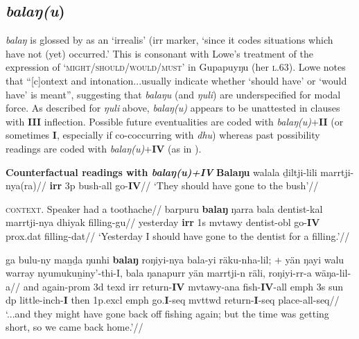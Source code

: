 \subsection*{\textit{balaŋ(u})}


\textit{balaŋ} is glossed by \cite[353]{Wilkinson1991} as an `irrealis' (\gls{irr} marker, `since it codes situations which have not (yet) occurred.' This is consonant with Lowe's treatment of the expression of `\textsc{might/should/would/must}' in Gupapuyŋu (her \textsc{l}.63). Lowe notes that ``[c]ontext and intonation...usually indicate whether `should have' or `would have' is meant'', suggesting that \textit{balaŋu} (and \textit{ŋuli}) are underspecified for modal force. As described for \textit{ŋuli} above, \textit{balaŋ(u)} appears to be unattested in clauses with \textbf{III} inflection. Possible future eventualities are coded with \textit{balaŋ(u)}+\textbf{II} (or sometimes \textbf{I}, especially if co-coccurring with \textit{dhu}) whereas past possibility readings are coded with \textit{balaŋ(u)}+\textbf{IV} (as in ).

\pex \textbf{Counterfactual readings with \textit{balaŋ(u)+IV}}
\a{}\begingl\gla\textbf{Balaŋu} walala ḏiltji-lili marrtji-nya(ra)//
\glb \textbf{\gls{irr}} 3p bush-\gls{all} go-\textbf{IV}// 
\glft`They should have gone to the bush'//\endgl

\a{}\begingl\glpreamble \textsc{context.} Speaker had a toothache//
\gla barpuru \textbf{balaŋ} ŋarra bala dentist-kal marrtji-nya dhiyak filling-gu//
\glb yesterday \textbf{\gls{irr}} 1s \gls{mvtawy} dentist-\gls{obl} go-\textbf{IV} \gls{prox}.\gls{dat} filling-\gls{dat}//
\glft`Yesterday I should have gone to the dentist for a filling.'//\endgl


\a{}\begingl\gla ga bulu-ny maṉḏa ŋunhi \textbf{balaŋ} roŋiyi-nya bala-yi räku-nha-lil; + yän ŋayi walu warray nyumukuṉiny'-thi-I, bala ŋanapurr yän marrtji-n räli, roŋiyi-rr-a wäŋa-lil-a//
\glb and again-\gls{prom} 3d \gls{texd} \gls{irr} return-\textbf{IV} \gls{mvtawy}-\gls{ana} fish-\textbf{IV}-\gls{all} \gls{emph} 3s sun \gls{dp} little-\gls{inch}-\textbf{I} then 1p.\gls{excl} \gls{emph} go.\textbf{I}-\gls{seq} \gls{mvttwd} return-\textbf{I}-\gls{seq} place-\gls{all}-\gls{seq}//
\glft`...and they might have gone back off fishing again; but the time was getting short, so we came back home.'//
\endgl

